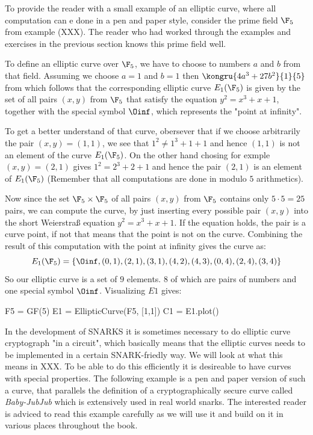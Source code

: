 \begin{example}To provide the reader with a small example of an elliptic curve, where all computation can e done in a pen and paper style, consider the prime field $\F_5$ from example (XXX). The reader who had worked through the examples and exercises in the previous section knows this prime field well.

To define an elliptic curve over $\F_5$, we have to choose to numbers $a$ and $b$ from that field. Assuming we choose $a=1$ and $b=1$ then $\kongru{4a^3+ 27b^2}{1}{5}$ from which follows that the corresponding elliptic curve $E_1(\F_5)$ is given by the set of all pairs $(x,y)$ from $\F_5$ that satisfy the equation $y^2=x^3+x+1$, together with the special symbol $\Oinf$, which represents the "point at infinity". 

To get a better understand of that curve, obersever that if we choose arbitrarily the pair $(x,y)=(1,1)$, we see that $1^2 \neq 1^3+1 + 1$ and hence $(1,1)$ is not an element of the curve $E_1(\F_5)$. On the other hand chosing for exmple $(x,y)=(2,1)$ gives $1^2 = 2^3 + 2 + 1$ and hence the pair $(2,1)$ is an element of $E_1(\F_5)$ (Remember that all computations are done in modulo $5$ arithmetics).

Now since the set $\F_5\times \F_5$ of all pairs $(x,y)$ from $\F_5$ contains only $5\cdot 5=25$ pairs, we can compute the curve, by just inserting every possible pair $(x,y)$ into the short Weierstraß equation $y^2 = x^3 + x +1$. If the equation holds, the pair is a curve point, if not that means that the point is not on the curve. Combining the result of this computation with the point at infinity gives the curve as:
$$
E_1(\F_5) = \{\Oinf, (0,1),(2,1),(3,1),(4,2),(4,3),(0,4),(2,4),(3,4)\}
$$
So our elliptic curve is a set of $9$ elements. $8$ of which are pairs of numbers and one special symbol $\Oinf$. Visualizing $E1$ gives:
\begin{sagesilent}
F5 = GF(5)
E1 = EllipticCurve(F5, [1,1])
C1 = E1.plot()
\end{sagesilent}
\begin{center} 
\end{center}
\end{example}
In the development of SNARKS it is sometimes necessary to do elliptic curve cryptograph "in a circuit", which basically means that the elliptic curves needs to be implemented in a certain SNARK-friedly way. We will look at what this means in XXX. To be able to do this efficiently it is desireable to have curves with special properties. The following example is a pen and paper version of such a curve, that parallels the definition of a cryptographically secure curve called \textit{Baby-JubJub} which is extensively used in real world snarks. The interested reader is adviced to read this example carefully as we will use it and build on it in various places throughout the book.
